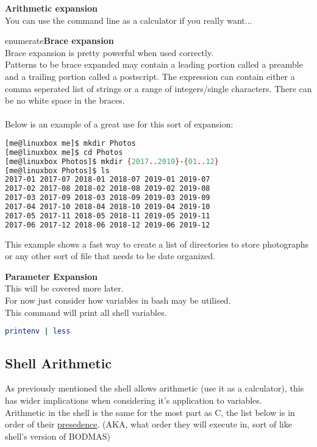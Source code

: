 \documentclass[12pt, letterpaper]{report}
\begin{document}
\textbf{Arithmetic expansion}\\
You can use the command line as a calculator if you really want...

\vspace{2.5mm}
enumerate\textbf{Brace expansion}\\
Brace expansion is pretty powerful when used correctly.\\
Patterns to be brace expanded may contain a leading portion called a preamble 
and a trailing portion called a postscript. The expression can contain either a 
comma seperated list of strings or a range of integers/single characters. There 
can be no white space in the braces.\\\\

Below is an example of a great use for this sort of expansion:

\begin{lstlisting}[language=Bash,framexleftmargin=5mm,frame=single,xleftmargin=18pt]
[me@linuxbox me]$ mkdir Photos
[me@linuxbox me]$ cd Photos
[me@linuxbox Photos]$ mkdir {2017..2019}-{01..12}
[me@linuxbox Photos]$ ls
2017-01 2017-07 2018-01 2018-07 2019-01 2019-07
2017-02 2017-08 2018-02 2018-08 2019-02 2019-08
2017-03 2017-09 2018-03 2018-09 2019-03 2019-09
2017-04 2017-10 2018-04 2018-10 2019-04 2019-10
2017-05 2017-11 2018-05 2018-11 2019-05 2019-11
2017-06 2017-12 2018-06 2018-12 2019-06 2019-12
\end{lstlisting}
This example shows a fast way to create a list of directories to store photographs 
or any other sort of file that needs to be date organized. 

\vspace{2.5mm}

\textbf{Parameter Expansion}\\
This will be covered more later.\\
For now just consider how variables in bash may be utilised.\\
This command will print all shell variables.
\begin{lstlisting}[language=Bash,framexleftmargin=5mm,frame=single,xleftmargin=18pt]
printenv | less
\end{lstlisting}

\subsection{Shell Arithmetic}
As previously mentioned the shell allows arithmetic (use it as a calculator), 
this has wider implications when considering it's application to variables.\\
Arithmetic in the shell is the same for the most part as C, the list below is 
in order of their \href{https://tldp.org/LDP/abs/html/opprecedence.html}{presedence}. (AKA, what order they will execute in, sort of like 
shell's version of BODMAS)\\
\end{document}
